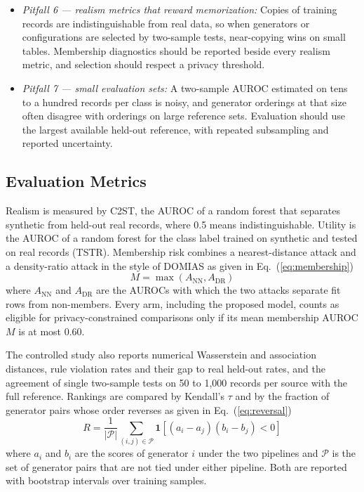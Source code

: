 \documentclass[conference]{IEEEtran}
\begin{document}
\begin{itemize}
\item \textit{Pitfall 6 --- realism metrics that reward memorization:} Copies of training records are indistinguishable from real data, so when generators or configurations are selected by two-sample tests, near-copying wins on small tables. Membership diagnostics should be reported beside every realism metric, and selection should respect a privacy threshold.
\item \textit{Pitfall 7 --- small evaluation sets:} A two-sample AUROC estimated on tens to a hundred records per class is noisy, and generator orderings at that size often disagree with orderings on large reference sets. Evaluation should use the largest available held-out reference, with repeated subsampling and reported uncertainty.
\end{itemize}

\subsection{Evaluation Metrics}

Realism is measured by C2ST, the AUROC of a random forest that separates synthetic from held-out real records, where 0.5 means indistinguishable. Utility is the AUROC of a random forest for the class label trained on synthetic and tested on real records (TSTR). Membership risk combines a nearest-distance attack and a density-ratio attack in the style of DOMIAS \cite{vanbreugel2023domias} as given in Eq.~(\ref{eq:membership})
\begin{equation}
M = \max\!\left(A_{\mathrm{NN}}, A_{\mathrm{DR}}\right)
\label{eq:membership}
\end{equation}
where $A_{\mathrm{NN}}$ and $A_{\mathrm{DR}}$ are the AUROCs with which the two attacks separate fit rows from non-members. Every arm, including the proposed model, counts as eligible for privacy-constrained comparisons only if its mean membership AUROC $M$ is at most 0.60.

The controlled study also reports numerical Wasserstein and association distances, rule violation rates and their gap to real held-out rates, and the agreement of single two-sample tests on 50 to 1,000 records per source with the full reference. Rankings are compared by Kendall's $\tau$ and by the fraction of generator pairs whose order reverses as given in Eq.~(\ref{eq:reversal})
\begin{equation}
R = \frac{1}{|\mathcal{P}|} \sum_{(i,j) \in \mathcal{P}} \mathbf{1}\!\left[(a_i - a_j)(b_i - b_j) < 0\right]
\label{eq:reversal}
\end{equation}
where $a_i$ and $b_i$ are the scores of generator $i$ under the two pipelines and $\mathcal{P}$ is the set of generator pairs that are not tied under either pipeline. Both are reported with bootstrap intervals over training samples.
\end{document}
